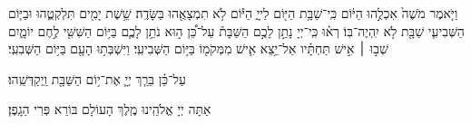 \fullkaddish

\aleinu

\begin{footnotesize}
	וַיֹּ֤אמֶר מֹשֶׁה֙ אִכְלֻ֣הוּ הַיּ֔וֹם כִּֽי־שַׁבָּ֥ת הַיּ֖וֹם לַייָ֑ הַיּ֕וֹם לֹ֥א תִמְצָאֻ֖הוּ בַּשָּׂדֶֽה׃ שֵׁ֥שֶׁת יָמִ֖ים תִּלְקְטֻ֑הוּ וּבַיּ֧וֹם הַשְּׁבִיעִ֛י שַׁבָּ֖ת לֹ֥א יִֽהְיֶה־בּֽוֹ׃ רְא֗וּ כִּֽי־יְיָ נָתַ֣ן לָכֶ֣ם הַשַּׁבָּת֒ עַל־כֵּ֠ן ה֣וּא נֹתֵ֥ן לָכֶ֛ם בַּיּ֥וֹם הַשִּׁשִּׁ֖י לֶ֣חֶם יוֹמָ֑יִם שְׁב֣וּ ׀ אִ֣ישׁ תַּחְתָּ֗יו אַל־יֵ֥צֵא אִ֛ישׁ מִמְּקֹמ֖וֹ בַּיּ֥וֹם הַשְּׁבִיעִֽי׃ וַיִּשְׁבְּת֥וּ הָעָ֖ם בַּיּ֥וֹם הַשְּׁבִעִֽי׃
\end{footnotesize}


עַל־כֵּ֗ן בֵּרַ֧ךְ יְיָ֛ אֶת־י֥וֹם הַשַּׁבָּ֖ת וַֽיְקַדְּשֵֽׁהוּ׃

\savri
{}
אַתָּה יְיָ אֱלֹהֵֽינוּ מֶֽלֶךְ הָעוֹלָם בּוֹרֵא פְּרִי הַגָֽפֶן׃\\
\quad{}\quad{}\\